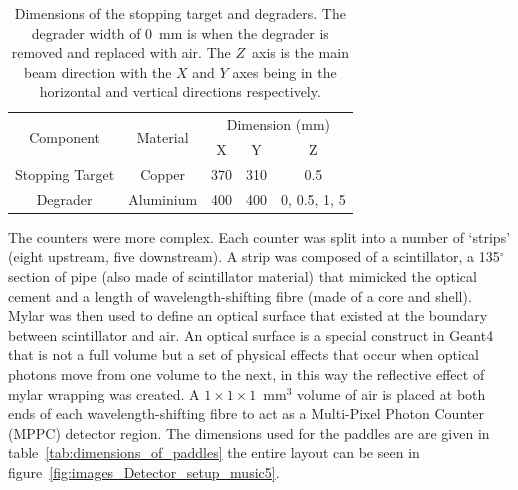 \begin{table}
  \begin{center}
  \begin{tabular}{c | c | c | c | c}
    \multirow{2}{*}{Component}
                     &  \multirow{2}{*}{Material} 
                                   &  \multicolumn{3}{c}{Dimension (mm)}  \\
                     &             &   X   &   Y   &       Z       \\
    \hline
    Stopping Target  &  Copper     &  370  &  310  &      0.5      \\
    Degrader         &  Aluminium  &  400  &  400  & 0, 0.5, 1, 5  \\
    
  \end{tabular}
  \end{center}
  \caption{Dimensions of the stopping target and degraders. The degrader width of 0~mm is when the degrader is removed and replaced with air. The \(Z\)~axis is the main beam direction with the \(X\) and \(Y\) axes being in the horizontal and vertical directions respectively.}
  \label{tab:st_and_deg_dimensions}
\end{table}

The counters were more complex. Each counter was split into a number of `strips' (eight upstream, five downstream). A strip was composed of a scintillator, a 135\(^{\circ}\) section of pipe (also made of scintillator material) that mimicked the optical cement and a length of wavelength-shifting fibre (made of a core and shell). Mylar was then used to define an optical surface that existed at the boundary between scintillator and air. An optical surface is a special construct in Geant4 that is not a full volume but a set of physical effects that occur when optical photons move from one volume to the next, in this way the reflective effect of mylar wrapping was created. A \(1\times1\times1\)~mm\(^3\) volume of air is placed at both ends of each wavelength-shifting fibre to act as a Multi-Pixel Photon Counter (MPPC) detector region. The dimensions used for the paddles are are given in table~\ref{tab:dimensions_of_paddles} the entire layout can be seen in figure~\ref{fig:images_Detector_setup_music5}.

